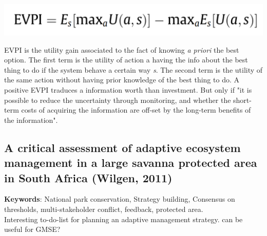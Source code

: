 \documentclass[12pt]{article}
\begin{document}
\begin{center}
    \includegraphics[scale=0.25]{EVPI-formula.png}
\end{center}
EVPI is the utility gain associated to the fact of knowing \textit{a priori} the best option. The first term is the utility of action a having the info about the best thing to do if the system behave a certain way \textit{s}. The second term is the utility of the same action without having prior knowledge of the best thing to do.
A positive EVPI traduces a information worth than investment. But only if "it is possible to reduce the uncertainty through monitoring, and whether the short-term costs of acquiring the information are off-set by the long-term benefits of the information".

\subsection{A critical assessment of adaptive ecosystem management in a large savanna protected area in South Africa (Wilgen, 2011)}
\textbf{Keywords}: National park conservation, Strategy building, Consensus on thresholds, multi-stakeholder conflict, feedback, protected area.\\

Interesting to-do-list for planning an adaptive management strategy. can be useful for GMSE?
\end{document}
